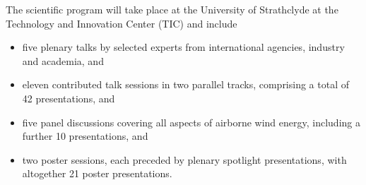 The scientific program will take place at the University of Strathclyde at the Technology and Innovation Center (TIC) and include\\

\begin{itemize}
\item five plenary talks by selected experts from international agencies, industry and academia, and
\item eleven contributed talk sessions in two parallel tracks, comprising a total of 42 presentations, and
\item five panel discussions covering all aspects of airborne wind energy, including a further 10 presentations, and
\item two poster sessions, each preceded by plenary spotlight presentations, with altogether 21 poster presentations.
\end{itemize}

\vspace*{6pt}

